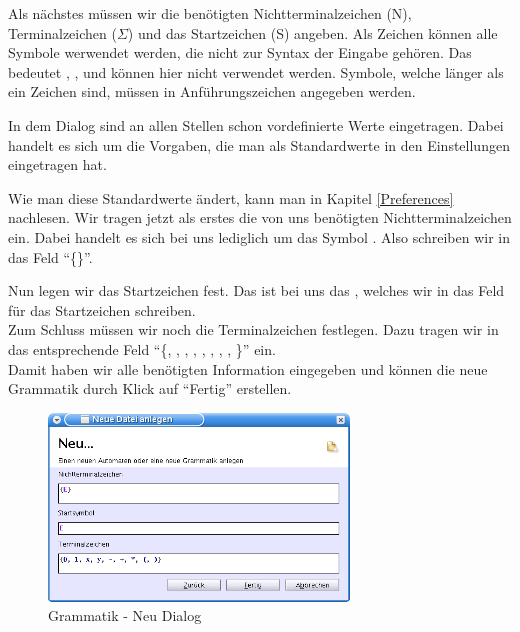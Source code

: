 Als nächstes müssen wir die benötigten Nichtterminalzeichen (N),
Terminalzeichen ($\Sigma$) und das Startzeichen (S) angeben.  Als Zeichen
können alle Symbole werwendet werden, die nicht zur Syntax der Eingabe gehören.
Das bedeutet \Symbol{,}, \Symbol{\{}, \Symbol{\}} und \SymbolEmpty{}
können hier nicht verwendet werden. Symbole, welche länger als ein Zeichen sind,
müssen in Anführungszeichen angegeben werden.\vspace{10pt}

In dem Dialog sind an allen Stellen schon vordefinierte Werte eingetragen.
Dabei handelt es sich um die Vorgaben, die man als Standardwerte in den
Einstellungen eingetragen hat.

Wie man diese Standardwerte ändert, kann man in Kapitel \ref{Preferences}
nachlesen. Wir tragen jetzt als erstes die von uns benötigten
Nichtterminalzeichen ein. Dabei handelt es sich bei uns lediglich um das Symbol
. Also schreiben wir in das Feld
"`\{\}"'.\vspace{10pt}

Nun legen wir das Startzeichen fest. Das ist bei uns das ,
welches wir in das Feld für das Startzeichen schreiben.\\
Zum Schluss müssen wir noch die Terminalzeichen festlegen. Dazu tragen
wir in das entsprechende Feld "`\{, ,
, , \TerminalSymbol{-}, \TerminalSymbol{+},
\TerminalSymbol{*}, \TerminalSymbol{(}, \TerminalSymbol{)}\}"' ein.\\ Damit
haben wir alle benötigten Information eingegeben und können die neue Grammatik
durch Klick auf "`Fertig"' erstellen.\vspace{10pt}

\begin{figure}[h]
\begin{center}
\includegraphics[width=8cm]{../images/new_dialog_grammar.png}
\caption{Grammatik - Neu Dialog}
\end{center}
\end{figure}

